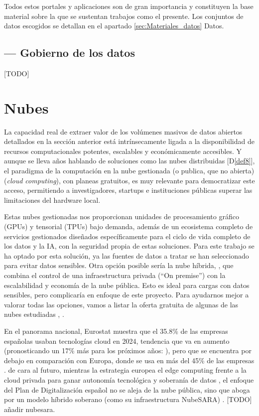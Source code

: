 	Todos estos portales y aplicaciones son de gran importancia y constituyen la base material sobre la que se sustentan trabajos como el presente. Los conjuntos de datos escogidos se detallan en el apartado \ref{sec:Materiales_datos} Datos.
	
	\subsection{--- Gobierno de los datos}
	
	[TODO]
	
	
\section{Nubes}
\label{sec:EstudiosNubes}

La capacidad real de extraer valor de los volúmenes masivos de datos abiertos detallados en la sección anterior está intrínsecamente ligada a la disponibilidad de recursos computacionales potentes, escalables y económicamente accesibles. Y aunque se lleva años hablando de soluciones como las nubes distribuidas [D\ref{def8}], el paradigma de la computación en la nube gestionada (o publica, que no abierta)  (\textit{cloud computing}), con planeas gratuitos, es muy relevante para democratizar este acceso, permitiendo a investigadores, startups e instituciones públicas superar las limitaciones del hardware local.

Estas nubes gestionadas nos proporcionan unidades de procesamiento gráfico (GPUs) y tensorial (TPUs) bajo demanda, además de un ecosistema completo de servicios gestionados diseñados específicamente para el ciclo de vida completo de los datos y la IA, con la seguridad propia de estas soluciones. Para este trabajo se ha optado por esta solución, ya las fuentes de datos a tratar se han seleccionado para evitar datos sensibles. 
Otra opción posible sería la nube híbrida, , que combina el control de una infraestructura privada (``On premise'') con la escalabilidad y economía de la nube pública. Esto es ideal para cargas con datos sensibles, pero complicaría en enfoque de este proyecto. 
Para ayudarnos mejor a valorar todas las opciones, vamos a listar la oferta gratuita de algunas de las nubes estudiadas \citep{MicrosoftCloudTerminology}, \citep{lisdorf2021cloud}.

En el panorama nacional, Eurostat muestra que el 35.8\% de las empresas españolas usaban tecnologías cloud en 2024, tendencia que va en aumento (pronosticando un 17\% más para los próximos años: \cite{EspannaCloudGroeth2033}), pero que se encuentra por debajo en comparación con Europa, donde se usa en más del 45\% de las empresas \citep{EurostatCloudUsage}. de cara al futuro, mientras la estrategia europea el edge computing frente a la cloud privada para ganar autonomía tecnológica y soberanía de datos \citep{EuroDigitalStrategyEdge}, el enfoque del Plan de Digitalización español \citep{GobEspana2021PlanDigitalizacion} no se aleja de la nube pública, sino que aboga por un modelo híbrido soberano (como su infraestructura NubeSARA) . [TODO] añadir nubesara.

